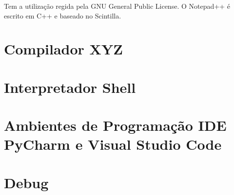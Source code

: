 	Tem a utilização regida pela GNU General Public License. O Notepad++ é escrito em C++ e baseado no Scintilla.
	
    \section{Compilador XYZ}


    \section{Interpretador Shell}

    \section{Ambientes de Programação IDE PyCharm e Visual Studio Code}
    
    \section{Debug}
     